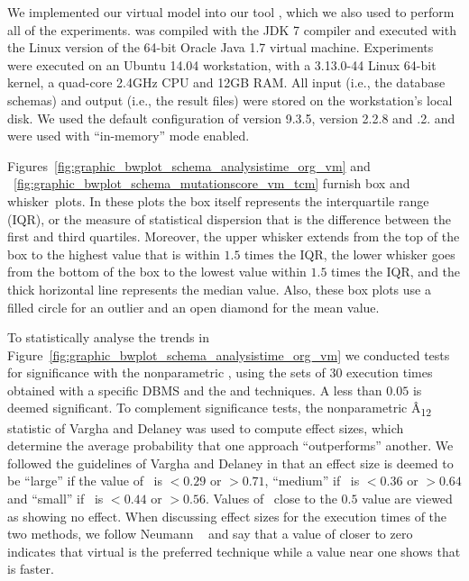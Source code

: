 

We implemented our virtual model into our \SA tool \cite{Kapfhammer2013,McMinn2015,Wright2014}, which we also used to
perform all of the experiments. \SA was compiled with the JDK 7 compiler and executed with the Linux version of the 64-bit Oracle Java 1.7 virtual machine.  Experiments were executed on an Ubuntu 14.04 workstation, with a 3.13.0-44 Linux 64-bit kernel, a quad-core 2.4GHz CPU and 12GB RAM. All input (i.e., the database schemas) and output (i.e., the result files) were stored on the workstation's local disk. We used the default configuration of \PostgreSQL version 9.3.5, \HyperSQL version 2.2.8 and .2.  \HyperSQL and \SQLite were used with ``in-memory'' mode enabled.


 Figures~\ref{fig:graphic_bwplot_schema_analysistime_org_vm} and ~\ref{fig:graphic_bwplot_schema_mutationscore_vm_tcm} furnish box and \mbox{whisker plots}.  In these plots the box itself represents the interquartile range (IQR), or the measure of statistical dispersion that is the difference between the first and third quartiles. Moreover, the upper whisker extends from the top of the box to the highest value that is within $1.5$ times the IQR, the lower whisker goes from the bottom of the box to the lowest value within $1.5$ times the IQR, and the thick horizontal line represents the median value. Also, these box plots use a filled circle for an outlier and an open diamond for the mean value.


\begin{sloppypar}
To statistically analyse the trends in Figure~\ref{fig:graphic_bwplot_schema_analysistime_org_vm} we conducted tests for significance with the nonparametric \wilcoxon, using the sets of 30 execution times obtained with a specific DBMS and the \Original and \vma techniques.  A \mbox{\pvalue} less than $0.05$ is deemed significant.  To complement significance tests, the nonparametric \^{A}\textsubscript{12} statistic of Vargha and Delaney \cite{Vargha2000} was used to compute effect sizes, which determine the average probability that one approach ``outperforms'' another.  We followed the guidelines of Vargha and Delaney in that an effect size is deemed to be ``large'' if the value of \atwelve~is $< 0.29$ or $> 0.71$, ``medium'' if \atwelve~is $< 0.36$ or $> 0.64$ and ``small'' if \atwelve~is $< 0.44$ or $> 0.56$.  Values of \atwelve~close to the $0.5$ value are viewed as showing no effect.  When discussing effect sizes for the execution times of the two methods, we follow Neumann \etal~\cite{Neumann2015} and say that a value of \atwelve closer to zero indicates that virtual is the preferred technique while a value near one shows that \Original is faster.
\end{sloppypar}

